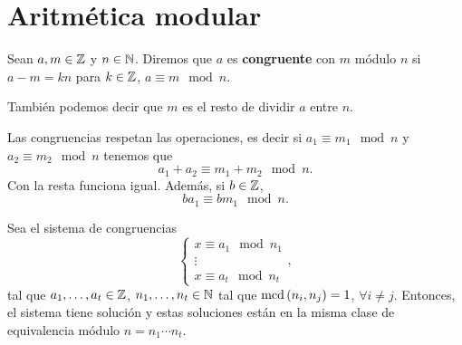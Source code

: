 \section{Aritmética modular}
\begin{definition}
Sean $\displaystyle a,m \in \mathbb{Z} $ y $\displaystyle n \in \mathbb{N} $. Diremos que $\displaystyle a $ es \textbf{congruente} con $\displaystyle m $ módulo $\displaystyle n $ si $\displaystyle a - m = kn $ para $\displaystyle k \in \mathbb{Z} $, $\displaystyle a\equiv m \mod n $. 
\end{definition}
\begin{observation}
También podemos decir que $\displaystyle m $ es el resto de dividir $\displaystyle a $ entre $\displaystyle n $.
\end{observation}
Las congruencias respetan las operaciones, es decir si $\displaystyle a_{1} \equiv m_{1} \mod n $ y $\displaystyle a_{2} \equiv m_{2}\mod n $ tenemos que
\[a_{1} + a_{2} \equiv m_{1} + m_{2} \mod n .\]
Con la resta funciona igual. Además, si $\displaystyle b \in \mathbb{Z} $, 
\[ba_{1} \equiv bm_{1} \mod n .\]
\begin{theorem}
Sea el sistema de congruencias
\[
\begin{cases}
x \equiv a_{1} \mod n_{1} \\
\vdots \\
x \equiv a_{t}\mod n_{t}
\end{cases}
,\]
tal que $\displaystyle a_{1}, \ldots, a_{t} \in \mathbb{Z} $, $\displaystyle n_{1}, \ldots, n_{t} \in \mathbb{N} $ tal que $\displaystyle \text{mcd}\left(n_{i}, n_{j}\right) = 1 $, $\displaystyle \forall i \neq j $. Entonces, el sistema tiene solución y estas soluciones están en la misma clase de equivalencia módulo $\displaystyle n = n_{1} \cdots n _{t} $.
\end{theorem}

